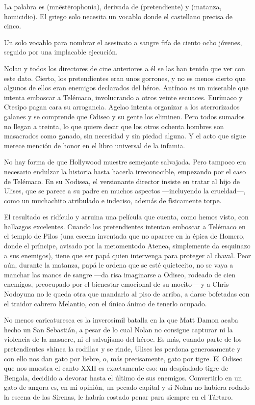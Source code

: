 
La palabra es  (mnēstērophonía), derivada de  (pretendiente) y  (matanza, homicidio). El griego solo necesita un vocablo donde el castellano precisa de cinco.

Un solo vocablo para nombrar el asesinato a sangre fría de ciento ocho jóvenes, seguido por una implacable ejecución.

Nolan y todos los directores de cine anteriores a él se las han tenido que ver con este dato. Cierto, los pretendientes eran unos gorrones, y no es menos cierto que algunos de ellos eran enemigos declarados del héroe. Antínoo es un miserable que intenta emboscar a Telémaco, involucrando a otros veinte secuaces. Eurímaco y Ctesipo pagan cara su arrogancia. Agelao intenta organizar a los aterrorizados galanes y se comprende que Odiseo y su gente los eliminen. Pero todos sumados no llegan a treinta, lo que quiere decir que los otros ochenta hombres son masacrados como ganado, sin necesidad y sin piedad alguna. Y el acto que sigue merece mención de honor en el libro universal de la infamia.

No hay forma de que Hollywood muestre semejante salvajada. Pero tampoco era necesario endulzar la historia hasta hacerla irreconocible, empezando por el caso de Telémaco. En su Nodisea, el versionante director insiste en tratar al hijo de Ulises, que se parece a su padre en muchos aspectos ---incluyendo la crueldad---, como un muchachito atribulado e indeciso, además de físicamente torpe.

El resultado es ridículo y arruina una película que cuenta, como hemos visto, con hallazgos excelentes. Cuando los pretendientes intentan emboscar a Telémaco en el templo de Pilos (una escena inventada que no aparece en la épica de Homero, donde el príncipe, avisado por la metomentodo Atenea, simplemente da esquinazo a sus enemigos), tiene que ser papá quien intervenga para proteger al chaval. Peor aún, durante la matanza, papá le ordena que se esté quietecito, no se vaya a manchar las manos de sangre ---da risa imaginarse a Odiseo, rodeado de cien enemigos, preocupado por el bienestar emocional de su mocito--- y a Chris Nodoyuna no le queda otra que mandarlo al piso de arriba, a darse bofetadas con el traidor cabrero Melantio, con el único ánimo de tenerlo ocupado.

No menos caricaturesca es la inverosímil batalla en la que Matt Damon acaba hecho un San Sebastián, a pesar de lo cual Nolan no consigue capturar ni la violencia de la masacre, ni el salvajismo del héroe. Es más, cuando parte de los pretendientes «hinca la rodilla» y se rinde, Ulises les perdona generosamente y con ello nos dan gato por liebre, o, más precisamente, gato por tigre. El Odiseo que nos muestra el canto XXII es exactamente eso: un despiadado tigre de Bengala, decidido a devorar hasta el último de sus enemigos. Convertirlo en un gato de angora es, en mi opinión, un pecado capital y si Nolan no hubiera rodado la escena de las Sirenas, le habría costado penar para siempre en el Tártaro.

